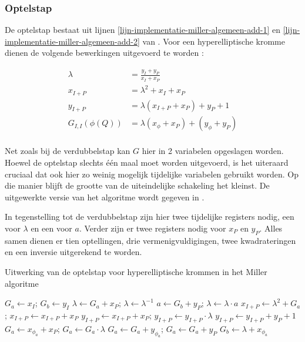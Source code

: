 \subsubsection{Optelstap}

De optelstap bestaat uit lijnen \ref{lijn-implementatie-miller-algemeen-add-1} en \ref{lijn-implementatie-miller-algemeen-add-2} van . Voor een hyperelliptische kromme dienen de volgende bewerkingen uitgevoerd te worden \cite{bertoni, hankerson-book}:

\[\begin{aligned}
	\lambda &= \frac{y_I + y_P}{x_I + x_P}\\
	x_{I + P} &= \lambda ^2 + x_I + x_P\\
	y_{I + P} &= \lambda (x_{I+P} + x_P) + y_P + 1\\
	G_{I,I}(\phi(Q)) &= \lambda (x_{\phi} + x_P) + (y_{\phi} + y_P)\\
\end{aligned}\]

Net zoals bij de verdubbelstap kan $G$ hier in 2 variabelen opgeslagen worden. Hoewel de optelstap slechts \'e\'en maal moet worden uitgevoerd, is het uiteraard cruciaal dat ook hier zo weinig mogelijk tijdelijke variabelen gebruikt worden. Op die manier blijft de grootte van de uiteindelijke schakeling het kleinst. De uitgewerkte versie van het algoritme wordt gegeven in .

In tegenstelling tot de verdubbelstap zijn hier twee tijdelijke registers nodig, een voor $\lambda$ en een voor $a$. Verder zijn er twee registers nodig voor $x_P$ en $y_P$. Alles samen dienen er tien optellingen, drie vermenigvuldigingen, twee kwadrateringen en een inversie uitgerekend te worden.

\begin{algorithm}[h]
	\caption{Uitwerking van de optelstap voor hyperelliptische krommen in het Miller algoritme}
	\label{algoritme-implementatie-miller-add-detail}
	$G_a \leftarrow x_I$; $G_b \leftarrow y_I$\;
	$\lambda \leftarrow G_a + x_P$; $\lambda \leftarrow \lambda^{-1}$\;
	$a \leftarrow G_b + y_P$; $\lambda \leftarrow \lambda \cdot a$\;
	$x_{I + P} \leftarrow \lambda ^2 + G_a$; $x_{I + P} \leftarrow x_{I + P} + x_P$\;
	$y_{I + P} \leftarrow x_{I + P} + x_P$; $y_{I + P} \leftarrow y_{I + P} \cdot \lambda$\;
	$y_{I + P} \leftarrow y_{I + P} + y_P + 1$\;
	$G_a \leftarrow x_{\phi_a} + x_P$; $G_a \leftarrow G_a \cdot \lambda$\;
	$G_a \leftarrow G_a + y_{\phi_a}$; $G_a \leftarrow G_a + y_P$\;
	$G_b \leftarrow \lambda + x_{\phi_a}$\;
\end{algorithm}

